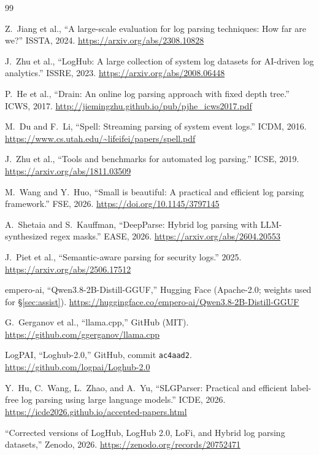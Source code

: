 \documentclass[11pt]{article}
\begin{document}
\clearpage
\begin{thebibliography}{99}
\small
\raggedright
\setlength{\itemsep}{1.55ex plus 0.4ex}
\setlength{\parsep}{0pt}
\setlength{\parskip}{0pt}
\sloppy
{} Z.~Jiang et al., ``A large-scale evaluation for log
parsing techniques: How far are we?'' ISSTA, 2024.
\url{https://arxiv.org/abs/2308.10828}

 J.~Zhu et al., ``LogHub: A large collection of system
log datasets for AI-driven log analytics.'' ISSRE, 2023.
\url{https://arxiv.org/abs/2008.06448}

 P.~He et al., ``Drain: An online log parsing approach
with fixed depth tree.'' ICWS, 2017.
\url{http://jiemingzhu.github.io/pub/pjhe_icws2017.pdf}

 M.~Du and F.~Li, ``Spell: Streaming parsing of system
event logs.'' ICDM, 2016.
\url{https://www.cs.utah.edu/~lifeifei/papers/spell.pdf}

 J.~Zhu et al., ``Tools and benchmarks for
automated log parsing.'' ICSE, 2019.
\url{https://arxiv.org/abs/1811.03509}

 M.~Wang and Y.~Huo, ``Small is beautiful: A
practical and efficient log parsing framework.'' FSE, 2026.
\url{https://doi.org/10.1145/3797145}

 A.~Shetaia and S.~Kauffman,
``DeepParse: Hybrid log parsing with LLM-synthesized regex masks.''
EASE, 2026. \url{https://arxiv.org/abs/2604.20553}

 J.~Piet et al., ``Semantic-aware parsing for
security logs.'' 2025. \url{https://arxiv.org/abs/2506.17512}

 empero-ai, ``Qwen3.8-2B-Distill-GGUF,'' Hugging
Face (Apache-2.0; weights used for \S\ref{sec:assist}).
\url{https://huggingface.co/empero-ai/Qwen3.8-2B-Distill-GGUF}

 G.~Gerganov et al., ``llama.cpp,'' GitHub (MIT).
\url{https://github.com/ggerganov/llama.cpp}

 LogPAI, ``Loghub-2.0,'' GitHub, commit
\texttt{ac4aad2}.
\url{https://github.com/logpai/Loghub-2.0}

 Y.~Hu, C.~Wang, L.~Zhao, and A.~Yu, ``SLGParser:
Practical and efficient label-free log parsing using large language
models.'' ICDE, 2026.
\url{https://icde2026.github.io/accepted-papers.html}

 ``Corrected versions of LogHub, LogHub 2.0,
LoFi, and Hybrid log parsing datasets,'' Zenodo, 2026.
\url{https://zenodo.org/records/20752471}


\end{thebibliography}
\end{document}
